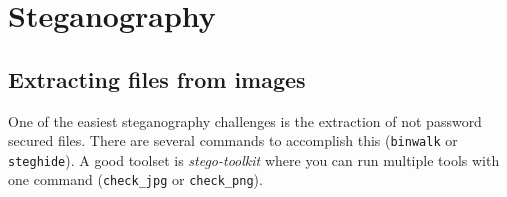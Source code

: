 
\section{Steganography}

\subsection{Extracting files from images}
One of the easiest steganography challenges is the extraction of not password secured files. There are several commands to accomplish this (\texttt{binwalk} or \texttt{steghide}). A good toolset is \emph{stego-toolkit} where you can run multiple tools with one command (\texttt{check\_jpg} or \texttt{check\_png}).